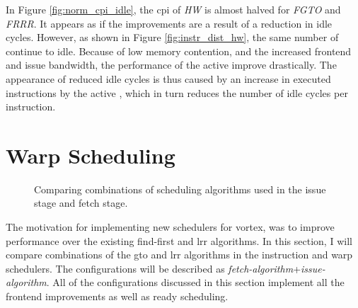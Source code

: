 In Figure \ref{fig:norm_cpi_idle}, the \acrshort{cpi} of \textit{HW} is almost halved for \textit{FGTO} and \textit{FRRR}. It appears as if the improvements are a result of a reduction in idle cycles. However, as shown in Figure \ref{fig:instr_dist_hw}, the same number of  continue to idle. Because of low memory contention, and the increased frontend and issue bandwidth, the performance of the active  improve drastically. The appearance of reduced idle cycles is thus caused by an increase in executed instructions by the active , which in turn reduces the number of idle cycles per instruction.

\section{Warp Scheduling} \label{sec:results_warp_scheduling}

\begin{figure}
    \centering
    \caption[Normalized \acrshort{cpi} stacks comparing schedulers.]{Comparing combinations of scheduling algorithms used in the issue stage and fetch stage.}
    \label{fig:cpi_norm_schedulers}
\end{figure}

The motivation for implementing new schedulers for \Gls{vortex}, was to improve performance over the existing find-first and \acrshort{lrr} algorithms. In this section, I will compare combinations of the \acrshort{gto} and \acrshort{lrr} algorithms in the instruction and warp schedulers. The configurations will be described as \textit{fetch-algorithm}+\textit{issue-algorithm}. All of the configurations discussed in this section implement all the frontend improvements as well as ready scheduling.

